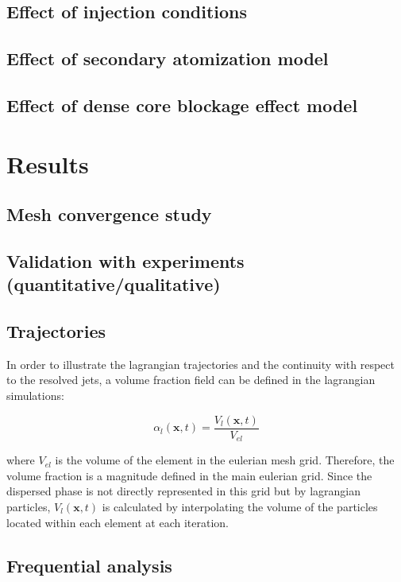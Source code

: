 \subsection{Effect of injection conditions}

\subsection{Effect of secondary atomization model}

\subsection{Effect of dense core blockage effect model}

\section{Results}

\subsection{Mesh convergence study}

\subsection{Validation with experiments (quantitative/qualitative)}

\subsection{Trajectories}

In order to illustrate the lagrangian trajectories and the continuity with respect to the resolved jets, a volume fraction field can be defined in the lagrangian simulations:

\begin{equation}
\alpha_l \left( \textbf{x}, t \right) = \frac{V_l \left( \textbf{x}, t \right)}{V_{el}}
\end{equation}

where $V_{el}$ is the volume of the element in the eulerian mesh grid. Therefore, the volume fraction is a magnitude defined in the main eulerian grid. Since the dispersed phase is not directly represented in this grid but by lagrangian particles, $V_l \left( \textbf{x}, t \right)$ is calculated by interpolating the volume of the particles located within each element at each iteration.

\subsection{Frequential analysis}

